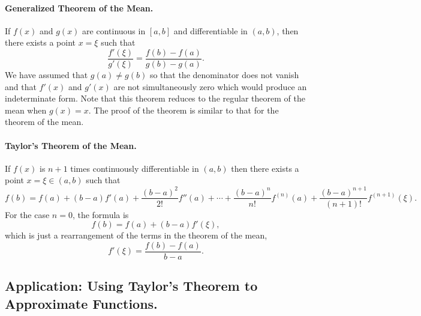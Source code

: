 \paragraph{Generalized Theorem of the Mean.}
If $f(x)$ and $g(x)$ are continuous in $[a,b]$ and differentiable in $(a,b)$,
then there exists a point $x = \xi$ such that
\[
\frac{f'(\xi)}{g'(\xi)} = \frac{f(b) - f(a)}{g(b) - g(a)}.
\]
We have assumed that $g(a) \neq g(b)$ so that the denominator does not 
vanish and that $f'(x)$ and $g'(x)$ are not simultaneously zero which 
would produce an indeterminate form.  Note that this theorem reduces to
the regular theorem of the mean when $g(x) = x$.  The proof of the
theorem is similar to that for the theorem of the mean.





\paragraph{Taylor's Theorem of the Mean.}
If $f(x)$ is $n+1$ times continuously differentiable in $(a,b)$ then there
exists a point $x = \xi \in (a,b)$ such that
\begin{equation}
  \label{taylors_theorem}
  f(b) = f(a) + (b-a) f'(a) + \frac{(b-a)^2}{2!} f''(a) + \cdots + 
  \frac{(b-a)^n}{n!} f^{(n)}(a) 
  + \frac{(b-a)^{n+1}}{(n+1)!} f^{(n+1)}(\xi).
\end{equation}
For the case $n = 0$, the formula is
\[
f(b) = f(a) + (b-a) f'(\xi),
\]
which is just a rearrangement of the terms in the theorem of the mean,
\[
f'(\xi) = \frac{f(b) - f(a)}{b-a}.
\]





\subsection{Application: Using Taylor's Theorem to Approximate Functions.}


